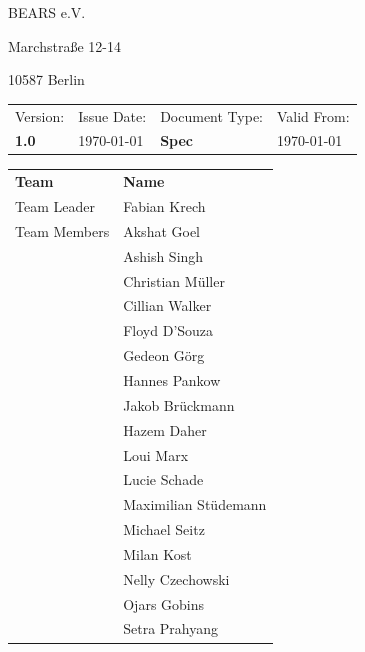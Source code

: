 \begin{titlepage}
    BEARS e.V.
    
    Marchstraße 12-14
    
    10587 Berlin

    \clearpage
    \thispagestyle{empty}

    \vspace{6cm}
    \bgroup
    \def\arraystretch{1.3}
    \begin{tabular}{|p{20mm}|p{30mm}|p{30mm}|p{30mm}|}
    \hline
    Version:    &   Issue Date: &   Document Type:  &   Valid From: \\
    \textbf{1.0}         &   \today      &   \textbf{Spec}            &   \today \\
    \hline
    \end{tabular}
    \egroup

    \vspace{4cm}
    
    \bgroup
    \def\arraystretch{1.3}
    \begin{tabular}{l  l}
    \textbf{Team}   & \textbf{Name} \\
    Team Leader     & Fabian Krech     \\
    Team Members    & Akshat Goel     \\
                    & Ashish Singh   \\
                    & Christian Müller     \\
                    & Cillian Walker     \\
                    & Floyd D'Souza     \\
                    & Gedeon Görg\\
                    & Hannes Pankow     \\
                    & Jakob Brückmann     \\
                    & Hazem Daher     \\
                    & Loui Marx     \\
                    & Lucie Schade     \\
                    & Maximilian Stüdemann     \\
                    & Michael Seitz     \\
                    & Milan Kost     \\
                    & Nelly Czechowski     \\
                    & Ojars Gobins     \\
                    & Setra Prahyang     \\
    \end{tabular}
    \egroup
    
\end{titlepage}